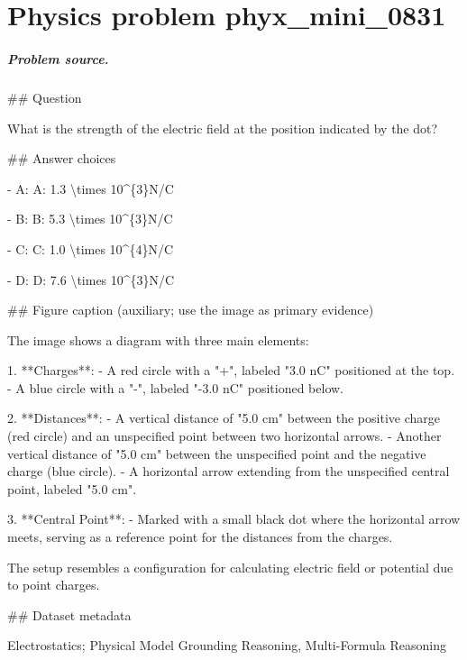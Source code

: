 
\chapter{Physics problem phyx\_mini\_0831}
\label{ch:PhyXMiniProblems_problem_phyx_mini_0831}

\paragraph{Problem source.}
\#\# Question

What is the strength of the electric field at the position indicated by the dot?

\#\# Answer choices

- A: A: 1.3 \textbackslash{}times 10\textasciicircum{}\{3\}N/C

- B: B: 5.3 \textbackslash{}times 10\textasciicircum{}\{3\}N/C

- C: C: 1.0 \textbackslash{}times 10\textasciicircum{}\{4\}N/C

- D: D: 7.6 \textbackslash{}times 10\textasciicircum{}\{3\}N/C

\#\# Figure caption (auxiliary; use the image as primary evidence)

The image shows a diagram with three main elements:

1. **Charges**:
   - A red circle with a "+", labeled "3.0 nC" positioned at the top.
   - A blue circle with a "-", labeled "-3.0 nC" positioned below.

2. **Distances**:
   - A vertical distance of "5.0 cm" between the positive charge (red circle) and an unspecified point between two horizontal arrows.
   - Another vertical distance of "5.0 cm" between the unspecified point and the negative charge (blue circle).
   - A horizontal arrow extending from the unspecified central point, labeled "5.0 cm".

3. **Central Point**:
   - Marked with a small black dot where the horizontal arrow meets, serving as a reference point for the distances from the charges.

The setup resembles a configuration for calculating electric field or potential due to point charges.

\#\# Dataset metadata

Electrostatics; Physical Model Grounding Reasoning, Multi-Formula Reasoning

